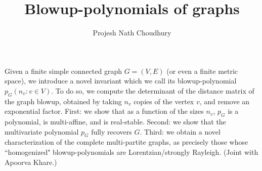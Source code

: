 \documentclass[a4paper]{amsart}
\date{}
\begin{document}
\title{Blowup-polynomials of graphs}
\author{Projesh Nath Choudhury} %
\address{Department of Mathematics\\Indian Institute of Science, Bangalore} %

\maketitle


 Given a finite simple connected graph $G = (V,E)$ (or even a finite metric space), we introduce a novel invariant which we call its blowup-polynomial $p_G({n_v : v \in V})$. To do so, we compute the determinant of the distance matrix of the graph blowup, obtained by taking $n_v$ copies of the vertex $v$, and remove an exponential factor. First: we show that as a function of the sizes $n_v$, $p_G$ is a polynomial, is multi-affine, and is real-stable. Second: we show that the multivariate polynomial $p_G$ fully recovers $G$. Third: we obtain a novel characterization of the complete multi-partite graphs, as precisely those whose ``homogenized" blowup-polynomials are Lorentzian/strongly Rayleigh. (Joint with Apoorva Khare.)
\end{document}
